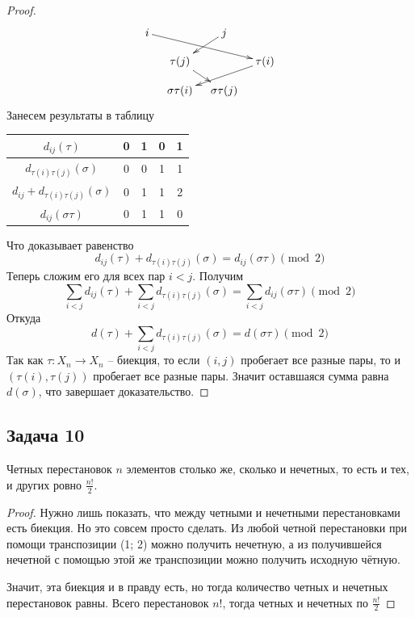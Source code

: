 \begin{proof}
\begin{align*}
{\begin{aligned}
\xymatrix@R=10pt@C=10pt{
	{i}\ar[drrr]&{}&{j}\ar[dl]&{}\\
	{}&{\tau(j)}\ar[dr]&{}&{\tau(i)}\ar[dll]\\
	{}&{\sigma\tau(i)}&{\sigma\tau(j)}&{}\\
}
\end{aligned}
}\\
\end{align*}
Занесем результаты в таблицу
\begin{center}
\begin{tabular}{|c|c|c|c|c|}
\hline
{$d_{ij}(\tau)$}&{0}&{1}&{0}&{1}\\
\hline
{$d_{\tau(i)\tau(j)}(\sigma)$}&{0}&{0}&{1}&{1}\\
\hline
{$d_{ij} + d_{\tau(i)\tau(j)}(\sigma)$}&{0}&{1}&{1}&{2}\\
\hline
{$d_{ij}(\sigma\tau)$}&{0}&{1}&{1}&{0}\\
\hline
\end{tabular}
\end{center}
Что доказывает равенство
\[
d_{ij}(\tau) + d_{\tau(i)\tau(j)}(\sigma) = d_{ij}(\sigma \tau) \pmod 2
\]
Теперь сложим его для всех пар $i < j$.
Получим
\[
\sum_{i<j}d_{ij}(\tau) + \sum_{i<j}d_{\tau(i)\tau(j)}(\sigma) = \sum_{i<j}d_{ij}(\sigma \tau) \pmod 2
\]
Откуда
\[
d(\tau) + \sum_{i<j}d_{\tau(i)\tau(j)}(\sigma) = d(\sigma \tau) \pmod 2
\]
Так как $\tau\colon X_n\to X_n$ -- биекция, то если $(i,j)$ пробегает все разные пары, то и $(\tau(i),\tau(j))$ пробегает все разные пары.
Значит оставшаяся сумма равна $d(\sigma)$, что завершает доказательство.
\end{proof}

\subsection{Задача 10}
Четных перестановок $n$ элементов столько же, сколько и нечетных, то есть и тех, и других ровно $\frac{n!}{2}$.

\begin{proof}
Нужно лишь показать, что между четными и нечетными перестановками есть биекция. Но это совсем просто сделать. Из любой четной перестановки при помощи транспозиции (1; 2) можно получить нечетную, а из получившейся нечетной с помощью этой же транспозиции можно получить исходную чётную.

Значит, эта биекция и в правду есть, но тогда количество четных и нечетных перестановок равны. Всего перестановок $n!$, тогда четных и нечетных по $\frac{n!}{2}$
\end{proof}

